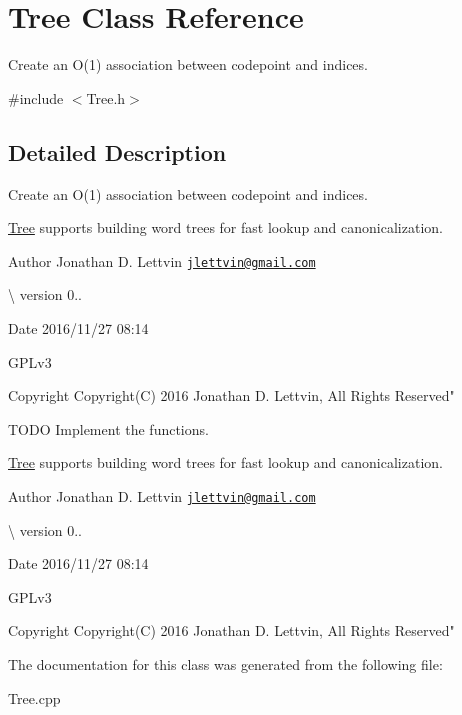 \hypertarget{class_tree}{}\section{Tree Class Reference}
\label{class_tree}


Create an O(1) association between codepoint and indices.  




{\ttfamily \#include $<$Tree.\+h$>$}



\subsection{Detailed Description}
Create an O(1) association between codepoint and indices. 

\hyperlink{class_tree}{Tree} supports building word trees for fast lookup and canonicalization.

\begin{DoxyAuthor}{Author}
Jonathan D. Lettvin \href{mailto:jlettvin@gmail.com}{\tt jlettvin@gmail.\+com}
\end{DoxyAuthor}
\textbackslash{} version 0..

\begin{DoxyDate}{Date}
2016/11/27 08\+:14
\end{DoxyDate}
G\+P\+Lv3

\begin{DoxyCopyright}{Copyright}
Copyright(\+C) 2016 Jonathan D. Lettvin, All Rights Reserved"
\end{DoxyCopyright}
T\+O\+D\+O Implement the functions.

\hyperlink{class_tree}{Tree} supports building word trees for fast lookup and canonicalization.

\begin{DoxyAuthor}{Author}
Jonathan D. Lettvin \href{mailto:jlettvin@gmail.com}{\tt jlettvin@gmail.\+com}
\end{DoxyAuthor}
\textbackslash{} version 0..

\begin{DoxyDate}{Date}
2016/11/27 08\+:14
\end{DoxyDate}
G\+P\+Lv3

\begin{DoxyCopyright}{Copyright}
Copyright(\+C) 2016 Jonathan D. Lettvin, All Rights Reserved" 
\end{DoxyCopyright}


The documentation for this class was generated from the following file\+:\begin{DoxyCompactItemize}
\item 
Tree.\+cpp\end{DoxyCompactItemize}
